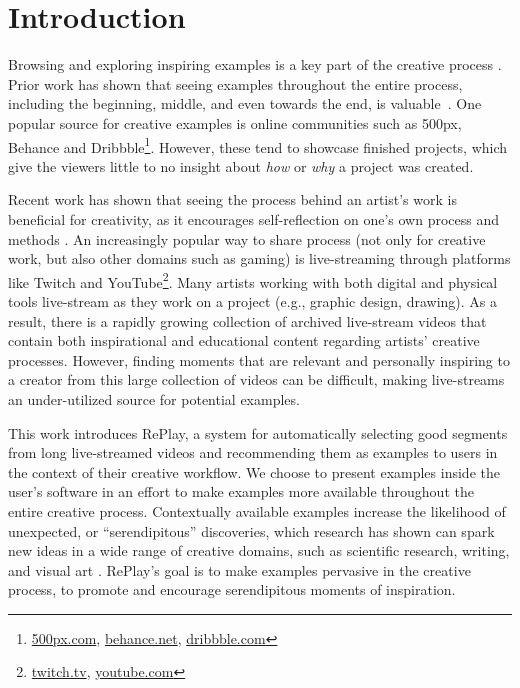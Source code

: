\section{Introduction}
Browsing and exploring inspiring examples is a key part of the creative process \cite{Shneiderman2007, Shneiderman2002, Greene2002, Herring2009, Bawden1986}. Prior work has shown that seeing examples throughout the entire process, including the beginning, middle, and even towards the end, is valuable~\cite{Kulkarni, Siangliulue2015}. One popular source for creative examples is online communities such as 500px, Behance and Dribbble\footnote{\url{500px.com}, \url{behance.net}, \url{dribbble.com}}. However, these tend to showcase finished projects, which give the viewers little to no insight about \textit{how} or \textit{why} a project was created. 

Recent work has shown that seeing the process behind an artist's work is beneficial for creativity, as it encourages self-reflection on one's own process and methods \cite{Kim2017}. An increasingly popular way to share process (not only for creative work, but also other domains such as gaming) is live-streaming through platforms like Twitch and YouTube\footnote{\url{twitch.tv}, \url{youtube.com}}. Many artists working with both digital and physical tools live-stream as they work on a project (e.g., graphic design, drawing). As a result, there is a rapidly growing collection of archived live-stream videos that contain both inspirational and educational content regarding artists' creative processes. However, finding moments that are relevant and personally inspiring to a creator from this large collection of videos can be difficult, making live-streams an under-utilized source for potential examples.

This work introduces RePlay, a system for automatically selecting good segments from long live-streamed videos and recommending them as examples to users in the context of their creative workflow. We choose to present examples inside the user's software in an effort to make examples more available throughout the entire creative process.
Contextually available examples increase the likelihood of unexpected, or ``serendipitous'' discoveries, which research has shown can spark new ideas in a wide range of creative domains, such as scientific research, writing, and visual art \cite{Bawden1986, Benjamin2014, Foster2003, Erdelez1999}. RePlay's goal is to make examples pervasive in the creative process, to promote and encourage serendipitous moments of inspiration. 

